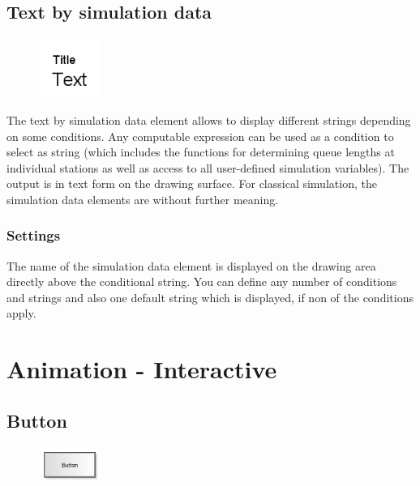\section{Text by simulation data}
\label{ref:ModelElementAnimationTextSelect}

\begin{figure}
\vspace{-22pt}
\includegraphics[width=2cm]{imageModelElementAnimationTextSelect.png}
\vspace{-22pt}
\end{figure}

The text by simulation data element allows to display different strings depending on some conditions.
Any computable expression can be used as a condition to select as string (which includes the functions for
determining queue lengths at individual stations as well as access to all user-defined simulation
variables). The output is in text form on the drawing surface. For classical simulation, the simulation
data elements are without further meaning.

\subsection*{Settings}

The name of the simulation data element is displayed on the drawing area directly above the conditional string.
You can define any number of conditions and strings and also one default string which is displayed,
if non of the conditions apply.





\chapter{Animation - Interactive}

\section{Button}
\label{ref:ModelElementInteractiveButton}

\begin{figure}
\vspace{-22pt}
\includegraphics[width=2cm]{imageModelElementInteractiveButton.png}
\vspace{-22pt}
\end{figure}

